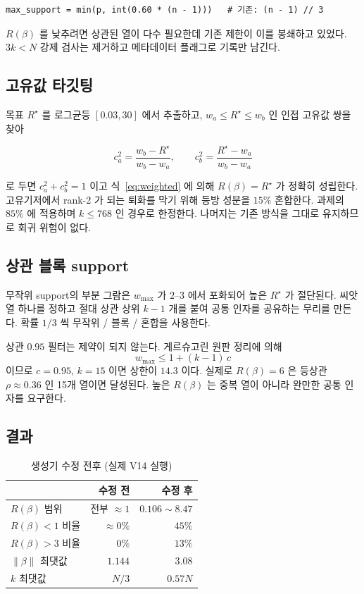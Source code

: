 \documentclass[11pt]{article}
\newcommand{\Rq}{R(\beta)}
\begin{document}
\begin{verbatim}
max_support = min(p, int(0.60 * (n - 1)))   # 기존: (n - 1) // 3
\end{verbatim}

$\Rq$ 를 낮추려면 상관된 열이 다수 필요한데 기존 제한이 이를 봉쇄하고 있었다.
$3k < N$ 강제 검사는 제거하고 메타데이터 플래그로 기록만 남긴다.

\subsection{고유값 타깃팅}

목표 $R^\star$ 를 로그균등 $[0.03, 30]$ 에서 추출하고,
$w_a \le R^\star \le w_b$ 인 인접 고유값 쌍을 찾아

\begin{equation}
c_a^2 = \frac{w_b - R^\star}{w_b - w_a},
\qquad
c_b^2 = \frac{R^\star - w_a}{w_b - w_a}
\end{equation}

로 두면 $c_a^2 + c_b^2 = 1$ 이고 식~\eqref{eq:weighted} 에 의해
$\Rq = R^\star$ 가 정확히 성립한다.
고유기저에서 rank-2 가 되는 퇴화를 막기 위해 등방 성분을 $15\%$ 혼합한다.
과제의 $85\%$ 에 적용하며 $k \le 768$ 인 경우로 한정한다.
나머지는 기존 방식을 그대로 유지하므로 회귀 위험이 없다.

\subsection{상관 블록 support}

무작위 support의 부분 그람은 $w_{\max}$ 가 $2$--$3$ 에서 포화되어
높은 $R^\star$ 가 절단된다. 씨앗 열 하나를 정하고 절대 상관 상위
$k-1$ 개를 붙여 공통 인자를 공유하는 무리를 만든다.
확률 $1/3$ 씩 무작위 / 블록 / 혼합을 사용한다.

상관 $0.95$ 필터는 제약이 되지 않는다. 게르슈고린 원판 정리에 의해
\begin{equation}
w_{\max} \le 1 + (k-1)\,c
\end{equation}
이므로 $c = 0.95$, $k = 15$ 이면 상한이 $14.3$ 이다.
실제로 $\Rq = 6$ 은 등상관 $\rho \approx 0.36$ 인 15개 열이면 달성된다.
높은 $\Rq$ 는 중복 열이 아니라 완만한 공통 인자를 요구한다.

\subsection{결과}

\begin{table}[h]
\centering
\caption{생성기 수정 전후 (실제 V14 실행)}
\begin{tabular}{@{}lrr@{}}
\toprule
 & 수정 전 & 수정 후 \\
\midrule
$\Rq$ 범위        & 전부 $\approx 1$ & $0.106 \sim 8.47$ \\
$\Rq < 1$ 비율    & $\approx 0\%$ & $45\%$ \\
$\Rq > 3$ 비율    & $0\%$ & $13\%$ \\
$\|\beta\|$ 최댓값 & $1.144$ & $3.08$ \\
$k$ 최댓값        & $N/3$ & $0.57N$ \\
\bottomrule
\end{tabular}
\end{table}
\end{document}
